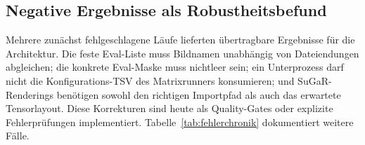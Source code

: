 \subsection{Negative Ergebnisse als Robustheitsbefund}

Mehrere zunächst fehlgeschlagene Läufe lieferten übertragbare Ergebnisse für
die Architektur. Die feste Eval-Liste muss Bildnamen unabhängig von
Dateiendungen abgleichen; die konkrete Eval-Maske muss nichtleer sein; ein
Unterprozess darf nicht die Konfigurations-TSV des Matrixrunners konsumieren;
und SuGaR-Renderings benötigen sowohl den richtigen Importpfad als auch das
erwartete Tensorlayout. Diese Korrekturen sind heute als Quality-Gates oder
explizite Fehlerprüfungen implementiert. Tabelle~\ref{tab:fehlerchronik}
dokumentiert weitere Fälle.
